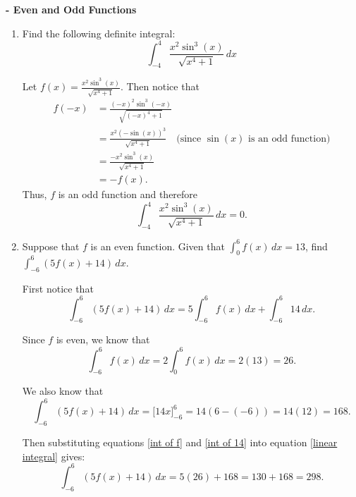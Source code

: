\documentclass[nooutcomes, handout]{ximera}
\renewcommand{\d}{\,d}
\newcommand{\dfn}{\textbf}
\newcommand{\eval}[1]{\bigg[ #1 \bigg]}
\begin{document}
\begin{problem}
\dfn{- Even and Odd Functions}
	\begin{enumerate}
	
	\item  Find the following definite integral:
	\begin{equation*}
	\int_{-4}^4 \frac{x^2 \sin^3(x)}{\sqrt{x^4 + 1}} \d x
	\end{equation*}
		\begin{freeResponse}
		Let $f(x) = \frac{x^2 \sin^3(x)}{\sqrt{x^4 + 1}}$.  
		Then notice that
			\begin{align*}
			f(-x) &= \frac{(-x)^2 \sin^3(-x)}{\sqrt{(-x)^4 + 1}}  \\
			&= \frac{x^2 (- \sin(x))^3}{\sqrt{x^4 + 1}}  \quad \text{(since } \sin(x) \text{ is an odd function)}  \\
			&= \frac{- x^2 \sin^3(x)}{\sqrt{x^4 + 1}}  \\
			&= -f(x).
			\end{align*}
		Thus, $f$ is an odd function and therefore
			\begin{equation*}
			\int_{-4}^4 \frac{x^2 \sin^3(x)}{\sqrt{x^4 + 1}} \d x = 0.
			\end{equation*}
		\end{freeResponse}
		
		
		
	\item  Suppose that $f$ is an even function.  Given that $\int_0^6 f(x) \d x = 13$, find $\int_{-6}^6 (5f(x) + 14) \d x$.
		\begin{freeResponse}
		First notice that
			\begin{equation}\label{linear integral}
			\int_{-6}^6 (5f(x) + 14) \d x = 5 \int_{-6}^6 f(x) \d x + \int_{-6}^6 14 \d x.
			\end{equation}
			
		Since $f$ is even, we know that
			\begin{equation}\label{int of f}
			\int_{-6}^6 f(x) \d x = 2 \int_0^6 f(x) \d x = 2 (13) = 26.
			\end{equation}
			
		We also know that
			\begin{equation}\label{int of 14}
			\int_{-6}^6 (5f(x) + 14) \d x = \eval{14x}_{-6}^6 = 14(6 - (-6)) = 14(12) = 168.
			\end{equation}
			
		Then substituting equations \eqref{int of f} and \eqref{int of 14} into equation \eqref{linear integral} gives:
			\begin{equation*}
			\int_{-6}^6 (5f(x) + 14) \d x = 5(26) + 168 = 130 + 168 = 298.
			\end{equation*}
		\end{freeResponse}
		
		
		
	\end{enumerate}
		
		
\end{problem}
\end{document}
